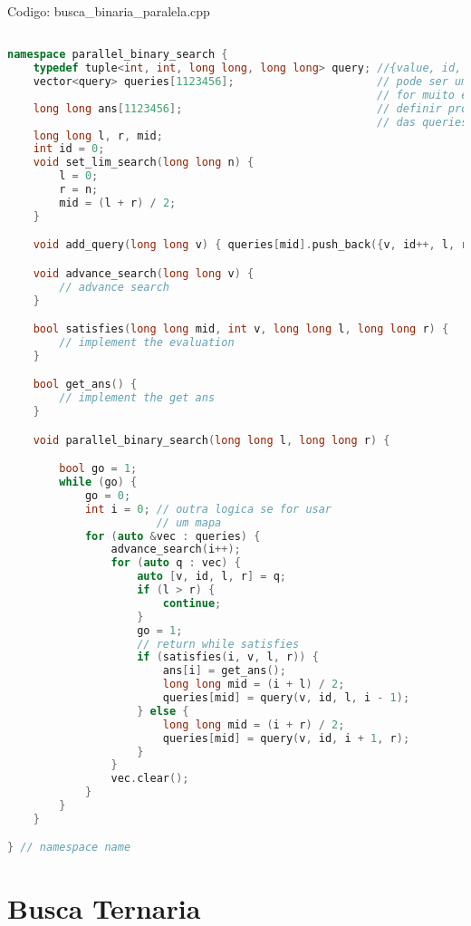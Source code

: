 \documentclass[10pt, a4paper, oneside]{book}
\begin{document}
\hfill

Codigo: busca\_binaria\_paralela.cpp

\begin{lstlisting}[language=C++]

namespace parallel_binary_search {
    typedef tuple<int, int, long long, long long> query; //{value, id, l, r}
    vector<query> queries[1123456];                      // pode ser um mapa se
                                                         // for muito esparso
    long long ans[1123456];                              // definir pro tamanho
                                                         // das queries
    long long l, r, mid;
    int id = 0;
    void set_lim_search(long long n) {
        l = 0;
        r = n;
        mid = (l + r) / 2;
    }

    void add_query(long long v) { queries[mid].push_back({v, id++, l, r}); }

    void advance_search(long long v) {
        // advance search
    }

    bool satisfies(long long mid, int v, long long l, long long r) {
        // implement the evaluation
    }

    bool get_ans() {
        // implement the get ans
    }

    void parallel_binary_search(long long l, long long r) {

        bool go = 1;
        while (go) {
            go = 0;
            int i = 0; // outra logica se for usar
                       // um mapa
            for (auto &vec : queries) {
                advance_search(i++);
                for (auto q : vec) {
                    auto [v, id, l, r] = q;
                    if (l > r) {
                        continue;
                    }
                    go = 1;
                    // return while satisfies
                    if (satisfies(i, v, l, r)) {
                        ans[i] = get_ans();
                        long long mid = (i + l) / 2;
                        queries[mid] = query(v, id, l, i - 1);
                    } else {
                        long long mid = (i + r) / 2;
                        queries[mid] = query(v, id, i + 1, r);
                    }
                }
                vec.clear();
            }
        }
    }

} // namespace name
\end{lstlisting}
\hfill

\section{Busca Ternaria}
\end{document}
